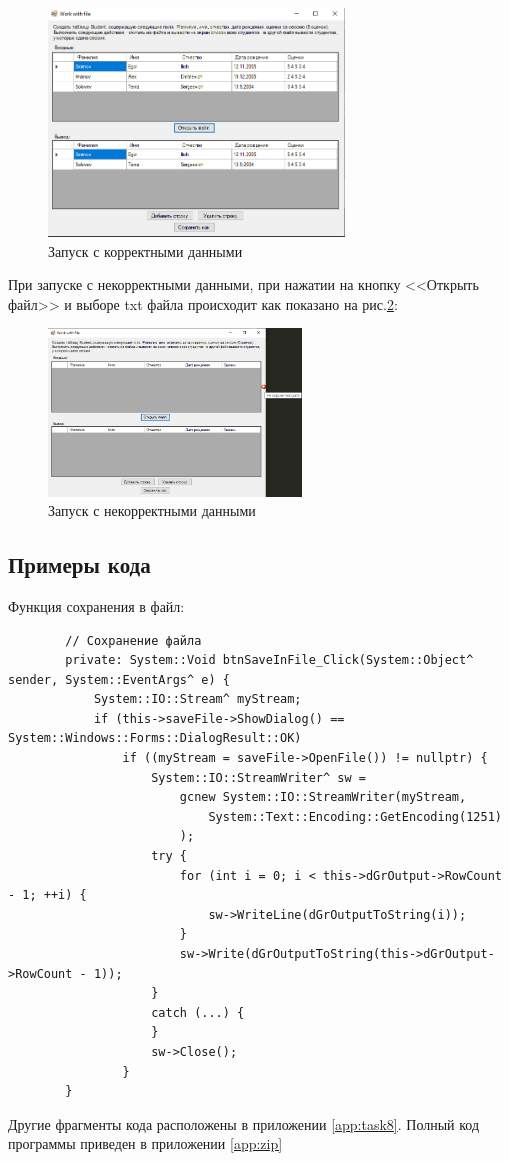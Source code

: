 \begin{figure}[!h]
    \centering
    \includegraphics[width = 0.7\textwidth]{images/Task8/WorkOpenFile.png}
    \caption{Запуск с корректными данными}
    \label{fig:WorkForm8}
\end{figure}

При запуске с некорректными данными, при нажатии на кнопку <<Открыть файл>> и выборе txt файла происходит как показано на рис.\ref{fig:BadInputNotIntForm8}:

\begin{figure}[!h]
    \centering
    \includegraphics[width = 0.6\textwidth]{images/Task8/OpenFileBadData.png}
    \caption{Запуск с некорректными данными}
    \label{fig:BadInputNotIntForm8}
\end{figure}

\subsection{Примеры кода}

Функция сохранения в файл:

\begin{verbatim}
		// Сохранение файла
		private: System::Void btnSaveInFile_Click(System::Object^ sender, System::EventArgs^ e) {
			System::IO::Stream^ myStream;
			if (this->saveFile->ShowDialog() == System::Windows::Forms::DialogResult::OK)
				if ((myStream = saveFile->OpenFile()) != nullptr) {
					System::IO::StreamWriter^ sw =
						gcnew System::IO::StreamWriter(myStream,
							System::Text::Encoding::GetEncoding(1251)
						);
					try {
						for (int i = 0; i < this->dGrOutput->RowCount - 1; ++i) {
							sw->WriteLine(dGrOutputToString(i));
						}
						sw->Write(dGrOutputToString(this->dGrOutput->RowCount - 1));
					}
					catch (...) {
					}
					sw->Close();
				}
		}
\end{verbatim}

Другие фрагменты кода расположены в приложении \ref{app:task8}. Полный код программы приведен в приложении \ref{app:zip}
